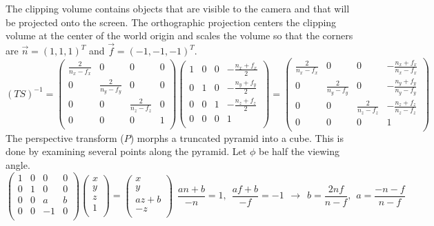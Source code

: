 \documentclass[10pt]{article}
\begin{document}
The clipping volume contains objects that are visible to the camera and that will be projected onto the screen. The orthographic projection centers the clipping volume at the center of the world origin and scales the volume so that the corners are $ \vec{n} = (1, 1, 1)^T $ and $ \vec{f} = (-1, -1, -1)^T $.
\[(TS)^{-1} = \begin{pmatrix}
\frac{2}{n_x-f_x} & 0 & 0 & 0 \\
0 & \frac{2}{n_y-f_y} & 0 & 0 \\
0 & 0 & \frac{2}{n_z-f_z} & 0 \\
0 & 0 & 0 & 1 \\
\end{pmatrix}
\begin{pmatrix}
1 & 0 & 0 & -\frac{n_x + f_x}{2} \\
0 & 1 & 0 & -\frac{n_y + f_y}{2} \\
0 & 0 & 1 & -\frac{n_z + f_z}{2} \\
0 & 0 & 0 & 1 \\
\end{pmatrix} =
\begin{pmatrix}
\frac{2}{n_x-f_x} & 0 & 0 & -\frac{n_x + f_x}{n_x-f_x} \\
0 & \frac{2}{n_y-f_y} & 0 & -\frac{n_y + f_y}{n_y-f_y} \\
0 & 0 & \frac{2}{n_z-f_z} & -\frac{n_z + f_z}{n_z-f_z} \\
0 & 0 & 0 & 1 \\
\end{pmatrix}\]
The perspective transform ($ P $) morphs a truncated pyramid into a cube. This is done by examining several points along the pyramid. Let $\phi$ be half the viewing angle.
\[\begin{pmatrix}
1 & 0 & 0 & 0 \\
0 & 1 & 0 & 0 \\
0 & 0 & a & b \\
0 & 0 & -1 & 0 \\
\end{pmatrix}
\begin{pmatrix}
x \\
y \\
z \\
1 \\
\end{pmatrix} =
\begin{pmatrix}
x \\
y \\
az + b \\
-z \\
\end{pmatrix}
\hspace{5pt}
\frac{an + b}{-n} = 1, \hspace{5pt}
\frac{af + b}{-f} = -1
\hspace{5pt}\rightarrow\hspace{5pt}
b = \frac{2nf}{n-f}, \hspace{5pt}
a = \frac{-n-f}{n-f}\]
\end{document}
